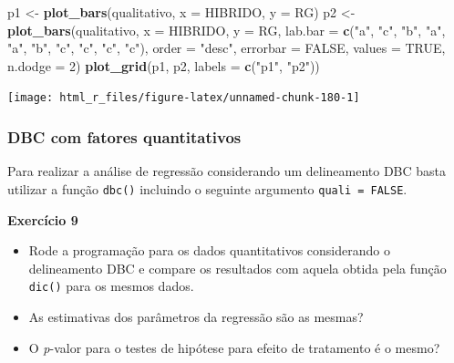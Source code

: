 \documentclass[
]{book}
\newenvironment{Shaded}{\begin{snugshade}}{\end{snugshade}}
\newcommand{\DataTypeTok}[1]{\textcolor[rgb]{0.13,0.29,0.53}{#1}}
\newcommand{\DecValTok}[1]{\textcolor[rgb]{0.00,0.00,0.81}{#1}}
\newcommand{\KeywordTok}[1]{\textcolor[rgb]{0.13,0.29,0.53}{\textbf{#1}}}
\newcommand{\NormalTok}[1]{#1}
\newcommand{\OtherTok}[1]{\textcolor[rgb]{0.56,0.35,0.01}{#1}}
\newcommand{\StringTok}[1]{\textcolor[rgb]{0.31,0.60,0.02}{#1}}
\begin{document}
\begin{Shaded}
\begin{Highlighting}[]
\NormalTok{p1 <-}\StringTok{ }\KeywordTok{plot_bars}\NormalTok{(qualitativo, }\DataTypeTok{x =}\NormalTok{ HIBRIDO, }\DataTypeTok{y =}\NormalTok{ RG)}
\NormalTok{p2 <-}\StringTok{ }\KeywordTok{plot_bars}\NormalTok{(qualitativo,}
                \DataTypeTok{x =}\NormalTok{ HIBRIDO,}
                \DataTypeTok{y =}\NormalTok{ RG,}
                \DataTypeTok{lab.bar =} \KeywordTok{c}\NormalTok{(}\StringTok{"a"}\NormalTok{, }\StringTok{"c"}\NormalTok{, }\StringTok{"b"}\NormalTok{, }\StringTok{"a"}\NormalTok{, }\StringTok{"a"}\NormalTok{, }\StringTok{"b"}\NormalTok{, }\StringTok{"c"}\NormalTok{, }\StringTok{"c"}\NormalTok{, }\StringTok{"c"}\NormalTok{, }\StringTok{"c"}\NormalTok{),}
                \DataTypeTok{order =} \StringTok{"desc"}\NormalTok{,}
                \DataTypeTok{errorbar =} \OtherTok{FALSE}\NormalTok{,}
                \DataTypeTok{values =} \OtherTok{TRUE}\NormalTok{,}
                \DataTypeTok{n.dodge =} \DecValTok{2}\NormalTok{)}
\KeywordTok{plot_grid}\NormalTok{(p1, p2, }\DataTypeTok{labels =} \KeywordTok{c}\NormalTok{(}\StringTok{"p1"}\NormalTok{, }\StringTok{"p2"}\NormalTok{))}
\end{Highlighting}
\end{Shaded}

\begin{center}\texttt{[image: html\_r\_files/figure-latex/unnamed-chunk-180-1]} \end{center}

\hypertarget{dbc-com-fatores-quantitativos}{%
\subsubsection{DBC com fatores quantitativos}\label{dbc-com-fatores-quantitativos}}

Para realizar a análise de regressão considerando um delineamento DBC basta utilizar a função \texttt{dbc()}  incluindo o seguinte argumento \texttt{quali\ =\ FALSE}.

\begin{tarefa}
\textbf{Exercício 9}

\begin{itemize}
\item
  Rode a programação para os dados quantitativos considerando o delineamento DBC e compare os resultados com aquela obtida pela função \texttt{dic()} para os mesmos dados.
\item
  As estimativas dos parâmetros da regressão são as mesmas?
\item
  O \emph{p}-valor para o testes de hipótese para efeito de tratamento é o mesmo?
\end{itemize}
\end{tarefa}
\end{document}
